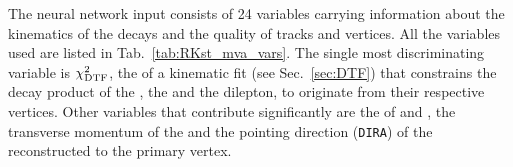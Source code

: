 The neural network input consists of 24 variables carrying information about the kinematics of the decays
and the quality of tracks and vertices. All the variables used are listed in Tab.~\ref{tab:RKst_mva_vars}.
The single most discriminating variable is $\chi^2_{\rm DTF}$, the \chisq of a kinematic fit (see Sec.~\ref{sec:DTF})
that constrains the decay product of the \Bz, the \Kstarz and the dilepton, to originate from their respective vertices.
Other variables that contribute significantly are the \chisqip of \jpsi and \Kstarz, the transverse momentum
of the \Bz and the pointing direction (\verb!DIRA!) of the reconstructed \Bz to the primary vertex.
%
%
\begin{table}
\centering
\caption{List of variables used as inputs for the neural network training.
}
\label{tab:RKst_mva_vars}
\end{table}
